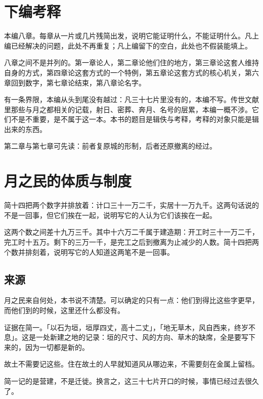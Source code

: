 \chapter*{下编\quad 考释}
{}
\setcounter{chapter}{0}

本编八章。每章从一片或几片残简出发，说明它能证明什么，不能证明什么。凡上编已经解决的问题，此处不再重复；凡上编留下的空白，此处也不假装能填上。

八章之间不是并列的。第一章论人，第二章论他们住的地方，第三章论这套人维持自身的方式，第四章论这套方式的一个特例，第五章论这套方式的核心机关，第六章回到数字，第七章论结束，第八章论名字。

有一条界限，本编从头到尾没有越过：凡三十七片里没有的，本编不写。传世文献里那些与月之都相关的记载，射日、密葬、奔月、名号的层累，本编一概不涉。它们不是不重要，是不属于这一本。本书的题目是辑佚与考释，考释的对象只能是辑出来的东西。

第二章与第七章可先读：前者复原城的形制，后者还原撤离的经过。

\chapter{月之民的体质与制度}

简十四把两个数字并排放着：计口三十一万二千，实居十一万九千。这两句话说的不是一回事，但它们挨在一起，说明写它的人认为它们该挨在一起。

这两个数之间差十九万三千。其中十六万二千属于建造期：开工时三十一万二千，完工时十五万。剩下的三万一千，是完工之后到撤离为止减少的人数。简十四把两个数并排刻着，说明写它的人知道这两笔不是一回事。

\section{来源}

月之民来自何处，本书说不清楚。可以确定的只有一点：他们到得比这些字更早，而他们到的时候，这里还什么都没有。

证据在简一。「以石为垣，垣厚四丈，高十二丈」，「地无草木，风自西来，终岁不息」。这是一处新建之地的记录：垣的尺寸、风的方向、草木的缺席，全是要写下来的，因为一切都是新的。

故土不需要记这些。住在故土的人早就知道风从哪边来，不需要刻在金属上留档。

简一记的是营建，不是迁徙。换言之，这三十七片开口的时候，事情已经过去很久了。


